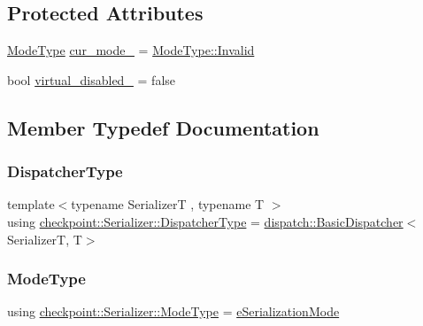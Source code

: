 \subsection*{Protected Attributes}
\begin{DoxyCompactItemize}
\item 
\hyperlink{namespacecheckpoint_ae2509499ccd8b1dc48fb535bf8aa3059}{Mode\+Type} \hyperlink{structcheckpoint_1_1_serializer_a89a1f207ad5ff75654cb6d48f432be37}{cur\+\_\+mode\+\_\+} = \hyperlink{namespacecheckpoint_ae2509499ccd8b1dc48fb535bf8aa3059a4bbb8f967da6d1a610596d7257179c2b}{Mode\+Type\+::\+Invalid}
\item 
bool \hyperlink{structcheckpoint_1_1_serializer_a46ef3c0da77d80853882a7cad641c2af}{virtual\+\_\+disabled\+\_\+} = false
\end{DoxyCompactItemize}


\subsection{Member Typedef Documentation}
\mbox{\label{structcheckpoint_1_1_serializer_ad8effc5884f1ed37b6b4507422f6d72c}} 
\subsubsection{\texorpdfstring{Dispatcher\+Type}{DispatcherType}}
{\footnotesize\ttfamily template$<$typename SerializerT , typename T $>$ \\
using \hyperlink{structcheckpoint_1_1_serializer_ad8effc5884f1ed37b6b4507422f6d72c}{checkpoint\+::\+Serializer\+::\+Dispatcher\+Type} =  \hyperlink{structcheckpoint_1_1dispatch_1_1_basic_dispatcher}{dispatch\+::\+Basic\+Dispatcher}$<$SerializerT, T$>$}

\mbox{\label{structcheckpoint_1_1_serializer_a4c307e2592dc4224d8a13148109c5764}} 
\subsubsection{\texorpdfstring{Mode\+Type}{ModeType}}
{\footnotesize\ttfamily using \hyperlink{namespacecheckpoint_ae2509499ccd8b1dc48fb535bf8aa3059}{checkpoint\+::\+Serializer\+::\+Mode\+Type} =  \hyperlink{namespacecheckpoint_ae2509499ccd8b1dc48fb535bf8aa3059}{e\+Serialization\+Mode}}



